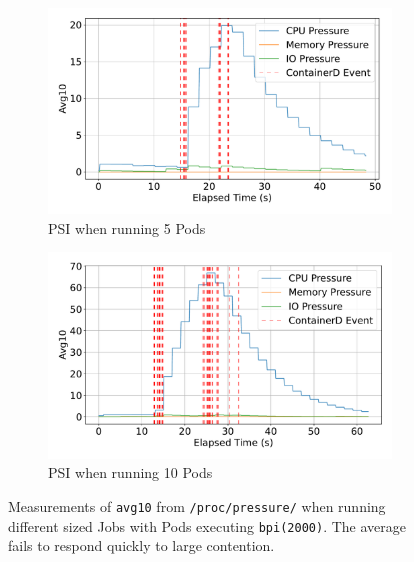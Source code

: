\begin{figure}[htbp]
    \begin{subfigure}[b]{0.48\textwidth}
        \centering
        \includegraphics[width=\linewidth]{images/avg-pressure-smallbatch.pdf}
        \caption{PSI when running 5 Pods} %
        \label{fig:avg-pressure-smallbatch}
    \end{subfigure}%
    \hfill
    \begin{subfigure}[b]{0.48\textwidth}
        \centering
        \includegraphics[width=\linewidth]{images/avg-pressure-bigbatch.pdf}
        \caption{PSI when running 10 Pods} %
        \label{fig:avg-pressure-bigbatch}
    \end{subfigure}
    \caption{Measurements of \texttt{avg10} from \texttt{/proc/pressure/} when
    running different sized Jobs with Pods executing \texttt{bpi(2000)}. The
    average fails to respond quickly to large contention.} %
    \label{fig:pressure-avg}
\end{figure}

